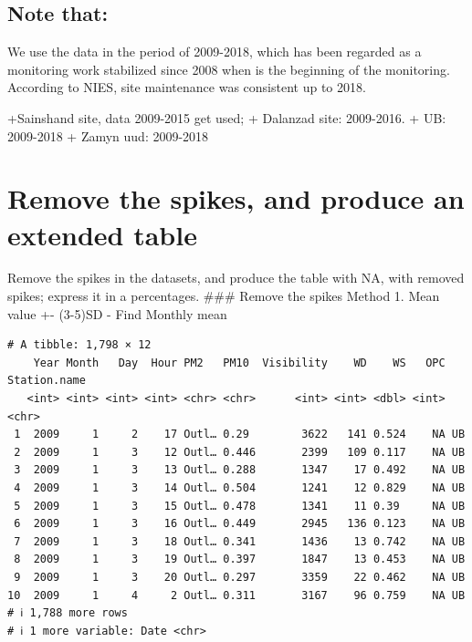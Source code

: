 \documentclass[
]{agujournal2019}
\begin{document}
\subsection{Note that:}\label{note-that}

We use the data in the period of 2009-2018, which has been regarded as a
monitoring work stabilized since 2008 when is the beginning of the
monitoring. According to NIES, site maintenance was consistent up to
2018.

+Sainshand site, data 2009-2015 get used; + Dalanzad site: 2009-2016. +
UB: 2009-2018 + Zamyn uud: 2009-2018

\section{Remove the spikes, and produce an extended
table}\label{remove-the-spikes-and-produce-an-extended-table}

Remove the spikes in the datasets, and produce the table with NA, with
removed spikes; express it in a percentages. \#\#\# Remove the spikes
Method 1. Mean value +- (3-5)SD - Find Monthly mean

\begin{verbatim}
# A tibble: 1,798 × 12
    Year Month   Day  Hour PM2   PM10  Visibility    WD    WS   OPC Station.name
   <int> <int> <int> <int> <chr> <chr>      <int> <int> <dbl> <int> <chr>       
 1  2009     1     2    17 Outl… 0.29        3622   141 0.524    NA UB          
 2  2009     1     3    12 Outl… 0.446       2399   109 0.117    NA UB          
 3  2009     1     3    13 Outl… 0.288       1347    17 0.492    NA UB          
 4  2009     1     3    14 Outl… 0.504       1241    12 0.829    NA UB          
 5  2009     1     3    15 Outl… 0.478       1341    11 0.39     NA UB          
 6  2009     1     3    16 Outl… 0.449       2945   136 0.123    NA UB          
 7  2009     1     3    18 Outl… 0.341       1436    13 0.742    NA UB          
 8  2009     1     3    19 Outl… 0.397       1847    13 0.453    NA UB          
 9  2009     1     3    20 Outl… 0.297       3359    22 0.462    NA UB          
10  2009     1     4     2 Outl… 0.311       3167    96 0.759    NA UB          
# ℹ 1,788 more rows
# ℹ 1 more variable: Date <chr>
\end{verbatim}
\end{document}
